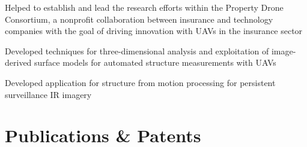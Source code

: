 \documentclass[]{deedy-resume-openfont}
\begin{document}
\begin{minipage}[t]{0.7\textwidth}
\begin{tightemize}
	\item Helped to establish and lead the research efforts within the Property Drone Consortium, a nonprofit collaboration between insurance and technology companies with the goal of driving innovation with UAVs in the insurance sector
	\item Developed techniques for three-dimensional analysis and exploitation of image-derived surface models for automated structure measurements with UAVs
\end{tightemize}
\sectionsep

\begin{tightemize}
	\item Developed application for structure from motion processing for persistent surveillance IR imagery
\end{tightemize}


\section{Publications \& Patents}
\renewcommand\refname{\vskip - 0.8cm} %


\nocite{*}


\end{minipage} 
\end{document}
